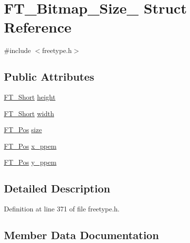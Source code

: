 \hypertarget{struct_f_t___bitmap___size__}{}\section{F\+T\+\_\+\+Bitmap\+\_\+\+Size\+\_\+ Struct Reference}
\label{struct_f_t___bitmap___size__}


{\ttfamily \#include $<$freetype.\+h$>$}

\subsection*{Public Attributes}
\begin{DoxyCompactItemize}
\item 
\mbox{\hyperlink{fttypes_8h_aa7279be89046a2563cd3d4d6651fbdcf}{F\+T\+\_\+\+Short}} \mbox{\hyperlink{struct_f_t___bitmap___size___adf2f24039b458ff4674712886f242262}{height}}
\item 
\mbox{\hyperlink{fttypes_8h_aa7279be89046a2563cd3d4d6651fbdcf}{F\+T\+\_\+\+Short}} \mbox{\hyperlink{struct_f_t___bitmap___size___ab9da94223f75a89a649d1e6d018b17f1}{width}}
\item 
\mbox{\hyperlink{ftimage_8h_af5f230f4b253d4c7715fd2e595614c90}{F\+T\+\_\+\+Pos}} \mbox{\hyperlink{struct_f_t___bitmap___size___a1db23a6220fb6bcb712430821a6e5352}{size}}
\item 
\mbox{\hyperlink{ftimage_8h_af5f230f4b253d4c7715fd2e595614c90}{F\+T\+\_\+\+Pos}} \mbox{\hyperlink{struct_f_t___bitmap___size___a6f877a792d2dc93328037c928979215f}{x\+\_\+ppem}}
\item 
\mbox{\hyperlink{ftimage_8h_af5f230f4b253d4c7715fd2e595614c90}{F\+T\+\_\+\+Pos}} \mbox{\hyperlink{struct_f_t___bitmap___size___a60d4d003d09fd57505f69f39e31e19c1}{y\+\_\+ppem}}
\end{DoxyCompactItemize}


\subsection{Detailed Description}


Definition at line 371 of file freetype.\+h.



\subsection{Member Data Documentation}
\mbox{\label{struct_f_t___bitmap___size___adf2f24039b458ff4674712886f242262}} 

